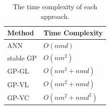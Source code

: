 \documentclass[useAMS,usenatbib,fleqn]{mn2e}
\begin{document}
 \begin{table}
\caption{The time complexity of each approach.}
\begin{center}
  \begin{tabular}{| l | l |}
     	Method		&	Time Complexity					\\	\hline
	ANN			&	$O\left(nmd\right)$					\\
	stable GP		&	$O\left(nm^{2}\right)$				\\
	GP-GL		&	$O\left(nm^{2}+nmd\right)$		\\	
	GP-VL		&	$O\left(nm^{2}+nmd\right)$		\\	
	GP-VC		&	$O\left(nm^{2}+nmd^{2}\right)$	\\	\hline
  \end{tabular}
\end{center}
\label{table-time-complexity}
\end{table}
\end{document}
